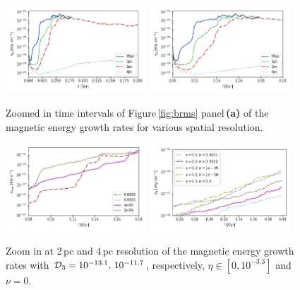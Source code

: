 \documentclass[iop,apj,numberedappendix,twocolappendix]{emulateapj}
\begin{document}
\begin{figure}
\centering
\includegraphics[trim=0.0cm 0.0cm 0.0cm 0.0cm,clip=true,width=0.47\textwidth]{csc_figs/eB-res-zoom.png}
\includegraphics[trim=0.0cm 0.0cm 0.0cm 0.0cm,clip=true,width=0.47\textwidth]{csc_figs/eB-res-2xzoom.png}
\caption{
Zoomed in time intervals of Figure\,\ref{fig:brms} panel\,{\bf(a)} of the magnetic energy growth rates for various spatial resolution.  
\label{fig:brms_res_zoom}
}
\end{figure}

\begin{figure}
\centering
\includegraphics[trim=0.0cm 0.0cm 0.0cm 0.0cm,clip=true,width=0.47\textwidth]{csc_figs/2pc-eB-zoom.png}
\includegraphics[trim=0.0cm 0.0cm 0.0cm 0.0cm,clip=true,width=0.47\textwidth]{csc_figs/4pc-eB-zoom.png}
\caption{
Zoom in at 2\,pc and 4\,pc resolution of the magnetic energy growth rates with  
${\cal{D}}_{3}=10^{-13.1},\,10^{-11.7}$, respectively, $\eta\in[0,10^{-3.3}]$ and $\nu=0$.
\label{fig:brms_zoom}
}
\end{figure}
\end{document}
